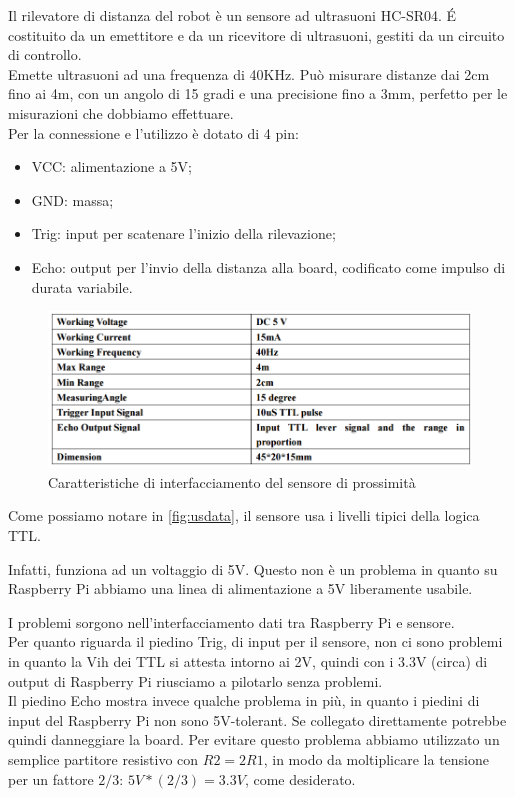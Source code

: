\documentclass[12pt]{article}
\newcommand{\raspi}{Raspberry Pi}
\begin{document}
Il rilevatore di distanza del robot è un sensore ad ultrasuoni HC-SR04.
\'E costituito da un emettitore e da un ricevitore di ultrasuoni, gestiti da un circuito di controllo.\\
Emette ultrasuoni ad una frequenza di 40KHz. Può misurare distanze dai 2cm fino ai 4m, con un angolo di 15 gradi e una precisione fino a 3mm, perfetto per le misurazioni che dobbiamo effettuare.\\
Per la connessione e l'utilizzo è dotato di 4 pin:
\begin{itemize}
\item VCC: alimentazione a 5V;
\item GND: massa;
\item Trig: input per scatenare l'inizio della rilevazione;
\item Echo: output per l'invio della distanza alla board, codificato come impulso di durata variabile.
\end{itemize}

\begin{figure}[h]
\includegraphics[width=\linewidth]{us_data}
\centering
\caption{Caratteristiche di interfacciamento del sensore di prossimità}
\label{fig:usdata}
\end{figure}



Come possiamo notare in \autoref{fig:usdata}, il sensore usa i livelli tipici della logica TTL.

Infatti, funziona ad un voltaggio di 5V. Questo non è un problema in quanto su \raspi{} abbiamo una linea di alimentazione a 5V liberamente usabile.

I problemi sorgono nell'interfacciamento dati tra \raspi{} e sensore.\\
Per quanto riguarda il piedino Trig, di input per il sensore, non ci sono problemi in quanto la Vih dei TTL si attesta intorno ai 2V, quindi con i 3.3V (circa) di output di \raspi{} riusciamo a pilotarlo senza problemi.\\
Il piedino Echo mostra invece qualche problema in più, in quanto i piedini di input del \raspi{} non sono 5V-tolerant. Se collegato direttamente potrebbe quindi danneggiare la board. Per evitare questo problema abbiamo utilizzato un semplice partitore resistivo con $R2 = 2R1$, in modo da moltiplicare la tensione per un fattore $2/3$: $5V*(2/3)=3.3V$, come desiderato.
\end{document}
